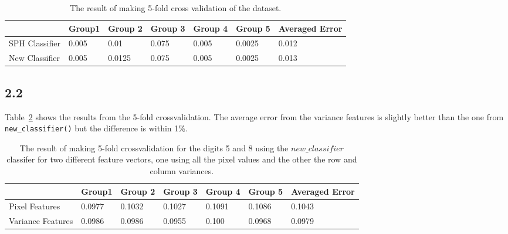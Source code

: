 \documentclass[table,xcdraw]{article}
\begin{document}
\begin{table}[H]
\centering
\caption{The result of making 5-fold cross validation of the dataset. }
\begin{tabular}{|l|l|l|l|l|l|l|}
\hline
               & Group1 & Group 2 & Group 3 & Group 4 & Group 5 & Averaged Error \\ \hline
SPH Classifier & 0.005  & 0.01    & 0.075   & 0.005   & 0.0025  & 0.012          \\ \hline
New Classifier & 0.005  & 0.0125  & 0.075   & 0.005   & 0.0025  & 0.013          \\ \hline
\end{tabular}
\label{tab:21}
\end{table}

\subsection*{2.2}

Table~\ref{tab:22} shows the results from the 5-fold crossvalidation. The average error from the variance features is slightly better than the one from \verb|new_classifier()| but the difference is within 1\%.

\begin{table}[H]
\centering
\caption{The result of making 5-fold crossvalidation for the digits 5 and 8 using the \texttt{$new\_classifier$} classifer for two different feature vectors, one using all the pixel values and the other the row and column variances.}

\begin{tabular}{|l|l|l|l|l|l|l|}
\hline
                  & Group1 & Group 2 & Group 3 & Group 4 & Group 5 & Averaged Error \\ \hline
Pixel Features    & 0.0977 & 0.1032  & 0.1027  & 0.1091  & 0.1086  & 0.1043         \\ \hline
Variance Features & 0.0986 & 0.0986  & 0.0955  & 0.100   & 0.0968  & 0.0979         \\ \hline
\end{tabular}
\label{tab:22}
\end{table}
\end{document}
